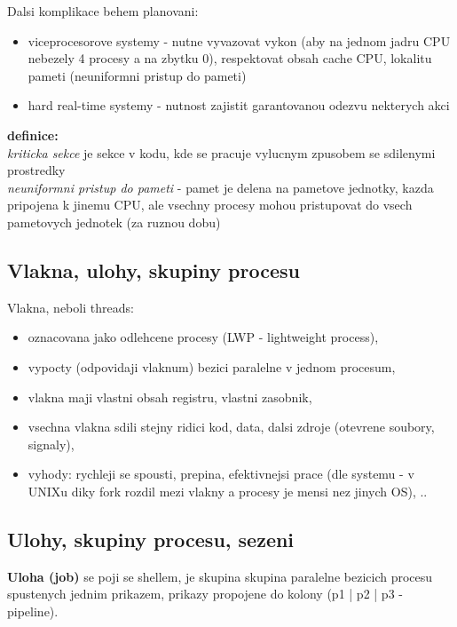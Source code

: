 \documentclass[a4paper, 11pt]{article}
\begin{document}
Dalsi komplikace behem planovani:
\begin{itemize}
    \item viceprocesorove systemy - nutne vyvazovat vykon (aby na jednom jadru CPU nebezely 4 procesy a na zbytku 0), respektovat obsah cache CPU, lokalitu pameti (neuniformni pristup do pameti)
    \item hard real-time systemy - nutnost zajistit garantovanou odezvu nekterych akci \\
\end{itemize}

\textbf{definice:} \\[0.5em]
\textit{kriticka sekce} je sekce v kodu, kde se pracuje vylucnym zpusobem se sdilenymi prostredky \\[0.2em]
\textit{neuniformni pristup do pameti} - pamet je delena na pametove jednotky, kazda pripojena k jinemu CPU, ale vsechny procesy mohou pristupovat do vsech pametovych jednotek (za ruznou dobu) \\

\subsection{Vlakna, ulohy, skupiny procesu}
Vlakna, neboli threads:
\begin{itemize}
    \item oznacovana jako odlehcene procesy (LWP - lightweight process),
    \item vypocty (odpovidaji vlaknum) bezici paralelne v jednom procesum,
    \item vlakna maji vlastni obsah registru, vlastni zasobnik,
    \item vsechna vlakna sdili stejny ridici kod, data, dalsi zdroje (otevrene soubory, signaly),
    \item vyhody: rychleji se spousti, prepina, efektivnejsi prace (dle systemu - v UNIXu diky fork rozdil mezi vlakny a procesy je mensi nez jinych OS), .. \\
\end{itemize}

\newpage

\subsection{Ulohy, skupiny procesu, sezeni}
\textbf{Uloha (job)} se poji se shellem, je skupina skupina paralelne bezicich procesu spustenych jednim prikazem, prikazy propojene do kolony (p1 | p2 | p3 - pipeline). \\
\end{document}
